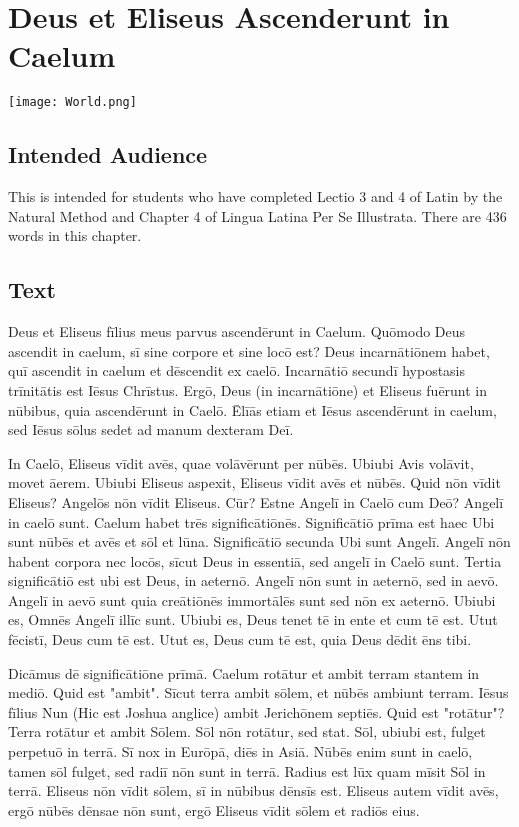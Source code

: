\chapter{Deus et Eliseus Ascenderunt in Caelum}
\begin{center}
\texttt{[image: World.png]}
\end{center}

\section{Intended Audience}
This is intended for students who have completed Lectio 3 and 4 of Latin by the Natural Method and Chapter 4 of Lingua Latina Per Se Illustrata. There are 436 words in this chapter.

\section{Text}
Deus et Eliseus fīlius meus parvus ascendērunt in Caelum. Quōmodo Deus ascendit in caelum, sī sine corpore et sine locō est? Deus incarnātiōnem habet, quī ascendit in caelum et dēscendit ex caelō. Incarnātiō secundī hypostasis trīnitātis est Iēsus Chrīstus. Ergō, Deus (in incarnātiōne) et Eliseus fuērunt in nūbibus, quia ascendērunt in Caelō. Ēlīās etiam et Iēsus ascendērunt in caelum, sed Iēsus sōlus sedet ad manum dexteram Deī. 

In Caelō, Eliseus vīdit avēs, quae volāvērunt per nūbēs. Ubiubi Avis volāvit, movet āerem. Ubiubi Eliseus aspexit, Eliseus vīdit avēs et nūbēs. Quid nōn vīdit Eliseus? Angelōs nōn vīdit Eliseus. Cūr? Estne Angelī in Caelō cum Deō?  Angelī in caelō sunt. Caelum habet trēs significātiōnēs. Significātiō prīma est haec \: Ubi sunt nūbēs et avēs et sōl et lūna. Significātiō secunda \: Ubi sunt Angelī. Angelī nōn habent corpora nec locōs, sīcut Deus in essentiā, sed angelī in Caelō sunt. Tertia significātiō est ubi est Deus, in aeternō. Angelī nōn sunt in aeternō, sed in aevō. Angelī in aevō sunt quia creātiōnēs immortālēs sunt sed nōn ex aeternō. Ubiubi es, Omnēs Angelī illīc sunt. Ubiubi es, Deus tenet tē in ente et cum tē est. Utut fēcistī, Deus cum tē est. Utut es, Deus cum tē est, quia Deus dēdit ēns tibi. 

Dicāmus dē significātiōne prīmā. Caelum rotātur et ambit terram stantem in mediō. Quid est "ambit". Sīcut terra ambit sōlem, et nūbēs ambiunt terram. Iēsus fīlius Nun (Hic est Joshua anglice) ambit Jerichōnem septiēs. Quid est "rotātur"? Terra rotātur et ambit Sōlem. Sōl nōn rotātur, sed stat. Sōl, ubiubi est, fulget perpetuō in terrā. Sī nox in Eurōpā, diēs in Asiā. Nūbēs enim sunt in caelō, tamen sōl fulget, sed radiī nōn sunt in terrā. Radius est lūx quam mīsit Sōl in terrā. Eliseus nōn vīdit sōlem, sī in nūbibus dēnsīs est. Eliseus autem vīdit avēs, ergō nūbēs dēnsae nōn sunt, ergō Eliseus vīdit sōlem et radiōs eius. 

